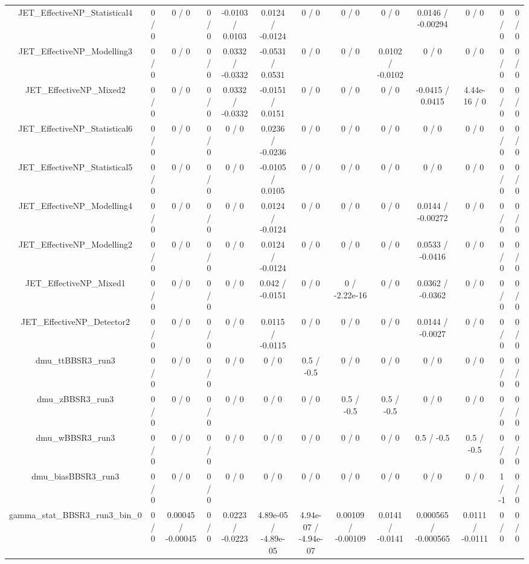 \documentclass[10pt]{article}
\begin{document}
\begin{table}[htbp]
\begin{center}
\begin{tabular}{|c|c|c|c|c|c|c|c|c|c|c|c|c|}
  JET_EffectiveNP_Statistical4 & 0 / 0 & 0 / 0 & 0 / 0 & -0.0103 / 0.0103 & 0.0124 / -0.0124 & 0 / 0 & 0 / 0 & 0 / 0 & 0.0146 / -0.00294 & 0 / 0 & 0 / 0 & 0 / 0 \\ 
  JET_EffectiveNP_Modelling3 & 0 / 0 & 0 / 0 & 0 / 0 & 0.0332 / -0.0332 & -0.0531 / 0.0531 & 0 / 0 & 0 / 0 & 0.0102 / -0.0102 & 0 / 0 & 0 / 0 & 0 / 0 & 0 / 0 \\ 
  JET_EffectiveNP_Mixed2 & 0 / 0 & 0 / 0 & 0 / 0 & 0.0332 / -0.0332 & -0.0151 / 0.0151 & 0 / 0 & 0 / 0 & 0 / 0 & -0.0415 / 0.0415 & 4.44e-16 / 0 & 0 / 0 & 0 / 0 \\ 
  JET_EffectiveNP_Statistical6 & 0 / 0 & 0 / 0 & 0 / 0 & 0 / 0 & 0.0236 / -0.0236 & 0 / 0 & 0 / 0 & 0 / 0 & 0 / 0 & 0 / 0 & 0 / 0 & 0 / 0 \\ 
  JET_EffectiveNP_Statistical5 & 0 / 0 & 0 / 0 & 0 / 0 & 0 / 0 & -0.0105 / 0.0105 & 0 / 0 & 0 / 0 & 0 / 0 & 0 / 0 & 0 / 0 & 0 / 0 & 0 / 0 \\ 
  JET_EffectiveNP_Modelling4 & 0 / 0 & 0 / 0 & 0 / 0 & 0 / 0 & 0.0124 / -0.0124 & 0 / 0 & 0 / 0 & 0 / 0 & 0.0144 / -0.00272 & 0 / 0 & 0 / 0 & 0 / 0 \\ 
  JET_EffectiveNP_Modelling2 & 0 / 0 & 0 / 0 & 0 / 0 & 0 / 0 & 0.0124 / -0.0124 & 0 / 0 & 0 / 0 & 0 / 0 & 0.0533 / -0.0416 & 0 / 0 & 0 / 0 & 0 / 0 \\ 
  JET_EffectiveNP_Mixed1 & 0 / 0 & 0 / 0 & 0 / 0 & 0 / 0 & 0.042 / -0.0151 & 0 / 0 & 0 / -2.22e-16 & 0 / 0 & 0.0362 / -0.0362 & 0 / 0 & 0 / 0 & 0 / 0 \\ 
  JET_EffectiveNP_Detector2 & 0 / 0 & 0 / 0 & 0 / 0 & 0 / 0 & 0.0115 / -0.0115 & 0 / 0 & 0 / 0 & 0 / 0 & 0.0144 / -0.0027 & 0 / 0 & 0 / 0 & 0 / 0 \\ 
  dmu_ttBBSR3_run3 & 0 / 0 & 0 / 0 & 0 / 0 & 0 / 0 & 0 / 0 & 0.5 / -0.5 & 0 / 0 & 0 / 0 & 0 / 0 & 0 / 0 & 0 / 0 & 0 / 0 \\ 
  dmu_zBBSR3_run3 & 0 / 0 & 0 / 0 & 0 / 0 & 0 / 0 & 0 / 0 & 0 / 0 & 0.5 / -0.5 & 0.5 / -0.5 & 0 / 0 & 0 / 0 & 0 / 0 & 0 / 0 \\ 
  dmu_wBBSR3_run3 & 0 / 0 & 0 / 0 & 0 / 0 & 0 / 0 & 0 / 0 & 0 / 0 & 0 / 0 & 0 / 0 & 0.5 / -0.5 & 0.5 / -0.5 & 0 / 0 & 0 / 0 \\ 
  dmu_biasBBSR3_run3 & 0 / 0 & 0 / 0 & 0 / 0 & 0 / 0 & 0 / 0 & 0 / 0 & 0 / 0 & 0 / 0 & 0 / 0 & 0 / 0 & 1 / -1 & 0 / 0 \\ 
  gamma_stat_BBSR3_run3_bin_0 & 0 / 0 & 0.00045 / -0.00045 & 0 / 0 & 0.0223 / -0.0223 & 4.89e-05 / -4.89e-05 & 4.94e-07 / -4.94e-07 & 0.00109 / -0.00109 & 0.0141 / -0.0141 & 0.000565 / -0.000565 & 0.0111 / -0.0111 & 0 / 0 & 0 / 0 \\ 

\end{tabular}
\end{center}
\end{table}
\end{document}
